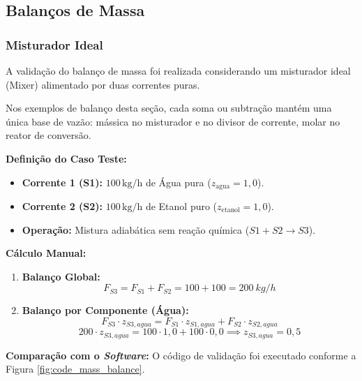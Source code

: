 \subsection{Balanços de Massa}
\subsubsection{Misturador Ideal}

A validação do balanço de massa foi realizada considerando um misturador ideal (Mixer) alimentado por duas correntes puras.

Nos exemplos de balanço desta seção, cada soma ou subtração mantém uma única base de vazão: mássica no misturador e no divisor de corrente, molar no reator de conversão.

\textbf{Definição do Caso Teste:}
\begin{itemize}
    \item \textbf{Corrente 1 (S1):} $100\,\mathrm{kg/h}$ de Água pura ($z_{\mathrm{agua}}=1{,}0$).
    \item \textbf{Corrente 2 (S2):} $100\,\mathrm{kg/h}$ de Etanol puro ($z_{\mathrm{etanol}}=1{,}0$).
    \item \textbf{Operação:} Mistura adiabática sem reação química ($S1 + S2 \to S3$).
\end{itemize}

\textbf{Cálculo Manual:}
\begin{enumerate}
    \item \textbf{Balanço Global:}
    \begin{equation}
        \label{eq:val_mixer_total_flow}
        F_{S3} = F_{S1} + F_{S2} = 100 + 100 = 200 \ kg/h
    \end{equation}
    
    \item \textbf{Balanço por Componente (Água):}
    \begin{equation}
        \label{eq:val_mixer_component_balance}
        F_{S3} \cdot z_{S3,agua} = F_{S1} \cdot z_{S1,agua} + F_{S2} \cdot z_{S2,agua}
    \end{equation}
    \begin{equation}
        \label{eq:val_mixer_water_fraction}
        200 \cdot z_{S3,agua} = 100 \cdot 1,0 + 100 \cdot 0,0 \implies z_{S3,agua} = 0,5
    \end{equation}
\end{enumerate}

\textbf{Comparação com o \textit{Software}:}
O código de validação foi executado conforme a Figura \ref{fig:code_mass_balance}.

